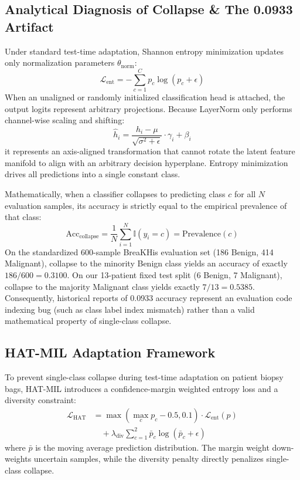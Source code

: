 \documentclass[conference]{IEEEtran}
\begin{document}
\subsection{Analytical Diagnosis of Collapse \& The 0.0933 Artifact}
Under standard test-time adaptation, Shannon entropy minimization updates only normalization parameters $\theta_{\text{norm}}$:
\begin{equation}
\mathcal{L}_{\text{ent}} = -\sum_{c=1}^C p_c \log(p_c + \epsilon)
\end{equation}
When an unaligned or randomly initialized classification head is attached, the output logits represent arbitrary projections. Because LayerNorm only performs channel-wise scaling and shifting:
\begin{equation}
\hat{h}_{i} = \frac{h_i - \mu}{\sqrt{\sigma^2 + \epsilon}} \cdot \gamma_i + \beta_i
\end{equation}
it represents an axis-aligned transformation that cannot rotate the latent feature manifold to align with an arbitrary decision hyperplane. Entropy minimization drives all predictions into a single constant class.

Mathematically, when a classifier collapses to predicting class $c$ for all $N$ evaluation samples, its accuracy is strictly equal to the empirical prevalence of that class:
\begin{equation}
\text{Acc}_{\text{collapse}} = \frac{1}{N} \sum_{i=1}^N \mathbb{I}(y_i = c) = \text{Prevalence}(c)
\end{equation}
On the standardized 600-sample BreaKHis evaluation set (186 Benign, 414 Malignant), collapse to the minority Benign class yields an accuracy of exactly $186 / 600 = \mathbf{0.3100}$. On our 13-patient fixed test split (6 Benign, 7 Malignant), collapse to the majority Malignant class yields exactly $7 / 13 = \mathbf{0.5385}$. Consequently, historical reports of 0.0933 accuracy represent an evaluation code indexing bug (such as class label index mismatch) rather than a valid mathematical property of single-class collapse.

\subsection{HAT-MIL Adaptation Framework}
To prevent single-class collapse during test-time adaptation on patient biopsy bags, HAT-MIL introduces a confidence-margin weighted entropy loss and a diversity constraint:
\begin{equation}
\begin{split}
\mathcal{L}_{\text{HAT}} &= \max\left(\max_c p_c - 0.5, 0.1\right) \cdot \mathcal{L}_{\text{ent}}(p) \\
&\quad + \lambda_{\text{div}} \sum_{c=1}^2 \bar{p}_c \log(\bar{p}_c + \epsilon)
\end{split}
\end{equation}
where $\bar{p}$ is the moving average prediction distribution. The margin weight down-weights uncertain samples, while the diversity penalty directly penalizes single-class collapse.
\end{document}
